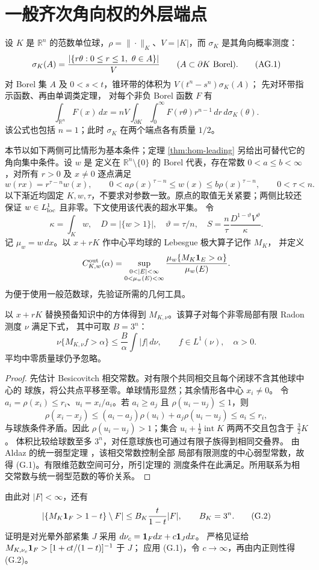 \section{一般齐次角向权的外层端点}\label{sec:homogeneous-endpoint}

设 $K$ 是 $\mathbb R^n$ 的范数单位球，$\rho=\|\cdot\|_K$、$V=|K|$，而 $\sigma_K$ 是其角向概率测度：
\[
 \sigma_K(A)=\frac{|\{r\theta:0\le r\le1,\ \theta\in A\}|}{V}
 \qquad(A\subset\partial K\ \hbox{Borel}).\tag{AG.1}
\]
对 Borel 集 $A$ 及 $0<s<t$，锥环带的体积为 $V(t^n-s^n)\sigma_K(A)$；
先对环带指示函数、再由单调类定理，
对每个非负 Borel 函数 $F$ 有
\[
 \int_{\mathbb R^n}F(x)\,dx
 =nV\int_{\partial K}\int_0^\infty F(r\theta)r^{n-1}\,dr\,d\sigma_K(\theta).
 \tag{AG.2}
\]
该公式也包括 $n=1$；此时 $\sigma_K$ 在两个端点各有质量 $1/2$。

本节以如下两侧可比情形为基本条件；定理 \ref{thm:hom-leading} 另给出可替代它的角向集中条件。设 $w$ 是
定义在 $\mathbb R^n\setminus\{0\}$ 的 Borel 代表，存在常数 $0<a\le b<\infty$，对所有 $r>0$ 及 $x\ne0$ 逐点满足
\[
 w(rx)=r^{\tau-n}w(x),\qquad
 0<a\rho(x)^{\tau-n}\le w(x)\le b\rho(x)^{\tau-n},\qquad0<\tau<n.\tag{H.1}
\]
以下渐近均固定 $K,w,\tau$，不要求对参数一致。原点的取值无关紧要；两侧比较还保证 $w\in L^1_{\rm loc}$ 且非零。下文使用该代表的超水平集。
令
\[
 \kappa=\int_Kw,\quad D=|\{w>1\}|,\quad\vartheta=\tau/n,
 \quad S=\frac{n}{\tau}\frac{D^{1-\vartheta}V^\vartheta}{\kappa}.\tag{H.2}
\]
记 $\mu_w=w\,dx$。以 $x+rK$ 作中心平均球的 Lebesgue 极大算子记作 $M_K$，
并定义
\[C^{\rm out}_{K,w}(\alpha)=
\sup_{\substack{0<|E|<\infty\\0<\mu_w(E)<\infty}}
\frac{\mu_w\{M_K\1_E>\alpha\}}{\mu_w(E)}.\]
为便于使用一般范数球，先验证所需的几何工具。
\begin{lemma}\label{lem:norm-weak}
以 $x+rK$ 替换预备知识中的方体得到 $M_{K,\nu}$。该算子对每个非零局部有限 Radon 测度 $\nu$ 满足下式，
其中可取 $B=3^n$：
\[\nu\{M_{K,\nu}f>\alpha\}\le\frac B\alpha\int|f|\,d\nu,
\qquad f\in L^1(\nu),\quad\alpha>0.\tag{G.1}\]
平均中零质量球仍予忽略。
\end{lemma}
\begin{proof}
先估计 Besicovitch 相交常数。对有限个共同相交且每个闭球不含其他球中心的
球族，将公共点平移至零。单球情形显然；其余情形各中心 $x_i\ne0$。
令 $a_i=\rho(x_i)\le r_i$、$u_i=x_i/a_i$。若 $a_i\ge a_j$ 且
$\rho(u_i-u_j)\le1$，则
\[\rho(x_i-x_j)\le(a_i-a_j)\rho(u_i)+a_j\rho(u_i-u_j)\le a_i\le r_i,\]
与球族条件矛盾。因此 $\rho(u_i-u_j)>1$；集合
$u_i+\frac12\operatorname{int}K$ 两两不交且包含于 $\frac32K$。
体积比较给球数至多 $3^n$，对任意球族也可通过有限子族得到相同交叠界。
由 Aldaz 的统一弱型定理 \cite[Theorem 1.2]{Aldaz2020}，该相交常数控制全部
局部有限测度的中心弱型常数，故得 (G.1)。有限维范数空间可分，所引定理的
测度条件在此满足。所用联系为相交常数与统一弱型范数的等价关系。
\end{proof}
由此对 $|F|<\infty$，还有
\[|\{M_K\mathbf 1_F>1-t\}\setminus F|\le B_K\frac t{1-t}|F|,
\qquad B_K=3^n.\tag{G.2}\]
证明是对光晕外部紧集 $J$ 采用 $d\nu_c=\mathbf 1_Fdx+c\mathbf 1_Jdx$。
严格见证给 $M_{K,\nu_c}\mathbf 1_F>[1+ct/(1-t)]^{-1}$ 于 $J$；
应用 (G.1)，令 $c\to\infty$，再由内正则性得 (G.2)。


